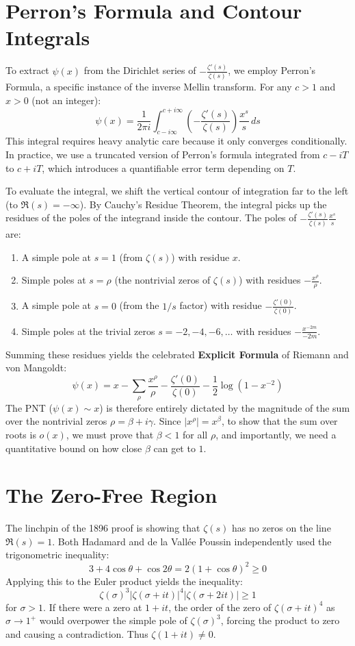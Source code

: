 \documentclass[12pt]{article}
\begin{document}
\section{Perron's Formula and Contour Integrals}
To extract $\psi(x)$ from the Dirichlet series of $-\frac{\zeta'(s)}{\zeta(s)}$, we employ Perron's Formula, a specific instance of the inverse Mellin transform. For any $c > 1$ and $x > 0$ (not an integer):
\[ \psi(x) = \frac{1}{2\pi i} \int_{c-i\infty}^{c+i\infty} \left(-\frac{\zeta'(s)}{\zeta(s)}\right) \frac{x^s}{s} \, ds \]
This integral requires heavy analytic care because it only converges conditionally. In practice, we use a truncated version of Perron's formula integrated from $c-iT$ to $c+iT$, which introduces a quantifiable error term depending on $T$.

To evaluate the integral, we shift the vertical contour of integration far to the left (to $\Re(s) = -\infty$). By Cauchy's Residue Theorem, the integral picks up the residues of the poles of the integrand inside the contour.
The poles of $-\frac{\zeta'(s)}{\zeta(s)} \frac{x^s}{s}$ are:
\begin{enumerate}
    \item A simple pole at $s = 1$ (from $\zeta(s)$) with residue $x$.
    \item Simple poles at $s = \rho$ (the nontrivial zeros of $\zeta(s)$) with residues $-\frac{x^\rho}{\rho}$.
    \item A simple pole at $s = 0$ (from the $1/s$ factor) with residue $-\frac{\zeta'(0)}{\zeta(0)}$.
    \item Simple poles at the trivial zeros $s = -2, -4, -6, \dots$ with residues $-\frac{x^{-2m}}{-2m}$.
\end{enumerate}

Summing these residues yields the celebrated \textbf{Explicit Formula} of Riemann and von Mangoldt:
\[ \psi(x) = x - \sum_{\rho} \frac{x^\rho}{\rho} - \frac{\zeta'(0)}{\zeta(0)} - \frac{1}{2}\log(1-x^{-2}) \]
The PNT ($\psi(x) \sim x$) is therefore entirely dictated by the magnitude of the sum over the nontrivial zeros $\rho = \beta + i\gamma$. Since $|x^\rho| = x^\beta$, to show that the sum over roots is $o(x)$, we must prove that $\beta < 1$ for all $\rho$, and importantly, we need a quantitative bound on how close $\beta$ can get to $1$.

\section{The Zero-Free Region}
The linchpin of the 1896 proof is showing that $\zeta(s)$ has no zeros on the line $\Re(s) = 1$. Both Hadamard and de la Vall\'ee Poussin independently used the trigonometric inequality:
\[ 3 + 4\cos \theta + \cos 2\theta = 2(1 + \cos \theta)^2 \ge 0 \]
Applying this to the Euler product yields the inequality:
\[ \zeta(\sigma)^3 |\zeta(\sigma + it)|^4 |\zeta(\sigma + 2it)| \ge 1 \]
for $\sigma > 1$. If there were a zero at $1+it$, the order of the zero of $\zeta(\sigma+it)^4$ as $\sigma \to 1^+$ would overpower the simple pole of $\zeta(\sigma)^3$, forcing the product to zero and causing a contradiction. Thus $\zeta(1+it) \neq 0$.
\end{document}
